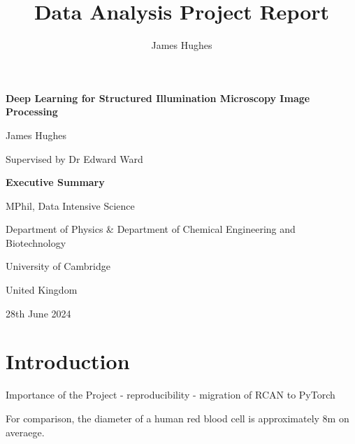 \documentclass[12pt]{article}
\title{Data Analysis Project Report}
\author{James Hughes}
\begin{document}
\begin{titlepage}
    \begin{center}
        \vspace*{1cm}

        \Huge
        \textbf{Deep Learning for Structured Illumination Microscopy Image Processing}

        \vspace{0.5cm}
        \LARGE

        James Hughes

        Supervised by Dr Edward Ward

        \vspace{2cm}
        \Huge
        \textbf{Executive Summary}

        \vfill

        MPhil, Data Intensive Science

        \vspace{0.8cm}

        \Large
        Department of Physics \& Department of Chemical Engineering and Biotechnology

        University of Cambridge

        United Kingdom

        28th June 2024

    \end{center}
\end{titlepage}

\newpage

\newpage
\section{Introduction}

Importance of the Project
- reproducibility
- migration of RCAN to PyTorch

For comparison, the diameter of a human red blood cell is approximately 8\textmu m on averaege.
\end{document}
